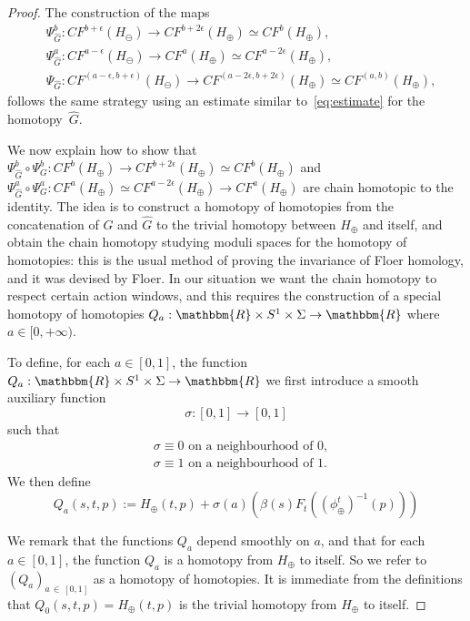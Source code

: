 \documentclass[AHL,Unicode,longabstracts,published]{cedram}
\newcommand{\R}{\mathbbm{R}}
\begin{document}
\begin{proof}
The construction of the maps
\begin{align}
& \Psi_{\widehat{G}}^b: CF^{b+ \epsilon}(H_\ominus) \to CF^{b+2\epsilon}(H_\oplus) \simeq CF^{b}(H_\oplus), \\
& \Psi_{\widehat{G}}^a: CF^{a-\epsilon }(H_\ominus) \to CF^{a}(H_\oplus) \simeq CF^{a-2\epsilon}(H_\oplus), \\
& \Psi_{\widehat{G}}: CF^{(a-\epsilon, b+\epsilon)}(H_\ominus) \to CF^{(a-2\epsilon,b+2\epsilon)}(H_\oplus) \simeq CF^{(a,b)}(H_\oplus),
\end{align}
follows the same strategy using an estimate similar to~\eqref{eq:estimate} for the homotopy~$\widehat{G}$.


We now explain how to show that $\Psi_{\widehat{G}}^b\circ \Psi_G^b: CF^{b}(H_\oplus) \to CF^{b+ 2\epsilon}(H_\oplus) \simeq CF^{b }(H_\oplus) $ and $\Psi_{\widehat{G}}^a\circ \Psi_G^a: CF^{a}(H_\oplus) \simeq CF^{a - 2\epsilon}(H_\oplus) \to CF^{a}(H_\oplus)$ are chain homotopic to the identity. The idea is to construct a homotopy of homotopies from the concatenation of $G$ and $\widehat{G}$ to the trivial homotopy between $H_\oplus$ and itself, and obtain the chain homotopy studying moduli spaces for the homotopy of homotopies: this is the usual method of proving the invariance of Floer homology, and it was devised by Floer. In our situation we want the chain homotopy to respect certain action windows, and this requires the construction of a special homotopy of homotopies $Q_a: \R \times S^1 \times \Sigma \to \R$ where $a\in [0,+\infty)$.

To define, for each $a \in [0,1]$, the function $Q_a: \R \times S^1 \times \Sigma \to \R$ we first introduce a smooth auxiliary function
\begin{equation}\label{eq:sigma}
\sigma:[0,1] \to [0,1]
\end{equation}
such that
\begin{align*}
&\sigma \equiv 0 \text{ on a neighbourhood of } 0, \\
&\sigma \equiv 1 \text{ on a neighbourhood of } 1.
\end{align*}
We then define
\begin{equation}\label{eq:Qasmall}
Q_a(s,t,p) := H_\oplus(t,p) + \sigma(a) \left(\beta(s) F_t((\phi_\oplus^t)^{-1}(p))\right)
\end{equation}

We remark that the functions $Q_a$ depend smoothly on $a$, and that for each $a \in [0,1]$, the function $Q_a$ is a homotopy from $H_\oplus$ to itself. So we refer to $(Q_a)_{a\,\in\,[0,1]}$ as a homotopy of homotopies. It is immediate from the definitions that $Q_0(s,t,p)=H_\oplus(t,p)$ is the trivial homotopy from $H_\oplus$ to itself.


\end{proof}
\end{document}
